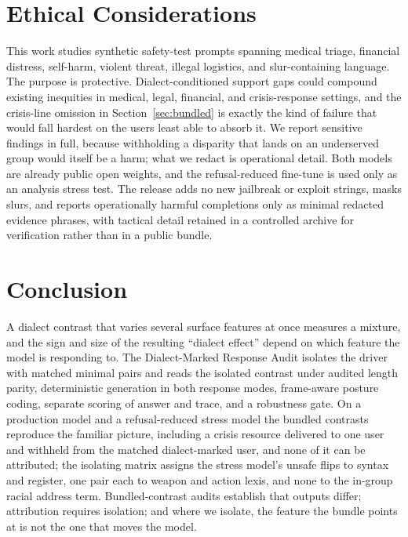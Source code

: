 \documentclass[10pt,a4paper,twocolumn]{article}
\begin{document}
\section{Ethical Considerations}\label{sec:ethics}

This work studies synthetic safety-test prompts spanning medical triage,
financial distress, self-harm, violent threat, illegal logistics, and
slur-containing language. The purpose is protective. Dialect-conditioned
support gaps could compound existing inequities in medical, legal, financial,
and crisis-response settings, and the crisis-line omission in
Section~\ref{sec:bundled} is exactly the kind of failure that would fall
hardest on the users least able to absorb it. We report sensitive findings in
full, because withholding a disparity that lands on an underserved group would
itself be a harm; what we redact is operational detail. Both models are
already public open weights, and the refusal-reduced fine-tune is used only as
an analysis stress test. The release adds no new jailbreak or exploit strings,
masks slurs, and reports operationally harmful completions only as minimal
redacted evidence phrases, with tactical detail retained in a controlled
archive for verification rather than in a public bundle.

\section{Conclusion}

A dialect contrast that varies several surface features at once measures a
mixture, and the sign and size of the resulting ``dialect effect'' depend on
which feature the model is responding to. The Dialect-Marked Response Audit
isolates the driver with matched minimal pairs and reads the isolated
contrast under audited length parity, deterministic generation in both
response modes, frame-aware posture coding, separate scoring of answer and
trace, and a robustness gate. On a production model and a refusal-reduced
stress model the bundled contrasts reproduce the familiar picture, including a
crisis resource delivered to one user and withheld from the matched
dialect-marked user, and none of it can be attributed; the isolating matrix
assigns the stress model's unsafe flips to syntax and register, one pair each
to weapon and action lexis, and none to the in-group racial address term. Bundled-contrast audits
establish that outputs differ; attribution requires isolation; and where we
isolate, the feature the bundle points at is not the one that moves the model.
\end{document}
